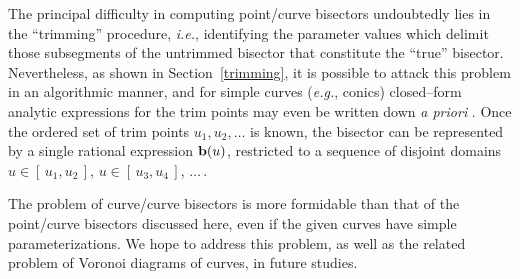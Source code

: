 The principal difficulty in computing point/curve bisectors undoubtedly
lies in the  ``trimming'' procedure, {\it i.e.}, identifying the parameter
values which delimit those subsegments of the untrimmed bisector 
that constitute the
``true'' bisector. Nevertheless, as shown in Section~\ref{trimming}, it is
possible to attack this problem in an algorithmic manner, and for simple
curves ({\it e.g.}, conics) closed--form analytic expressions for the
trim points may even be written down {\it a priori\/} \cite{faroukijj91}.
Once the ordered set of trim points $u_1,u_2,\ldots$ is known, the
bisector can be represented by a single rational expression ${\bf b}(u)$,
restricted to a sequence of disjoint domains $u \in [\,u_1,u_2\,]$, $u
\in [\,u_3,u_4\,]$, $\ldots\,$.

The problem of curve/curve bisectors is more formidable than that
of the point/curve bisectors discussed here, even if the given curves
have simple parameterizations. We hope to address this problem, as well
as the related problem of Voronoi diagrams of curves, in future studies.

